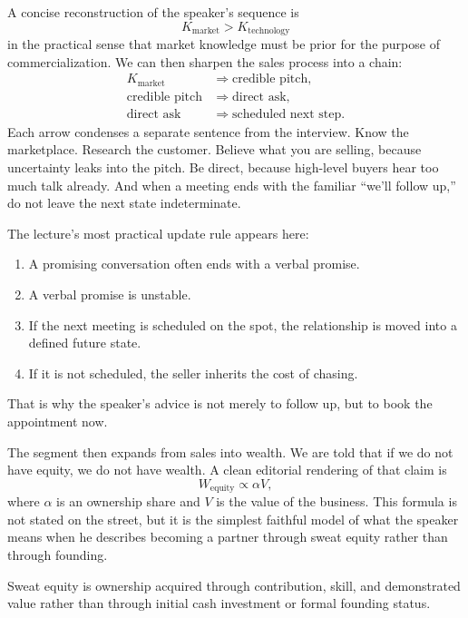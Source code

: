 A concise reconstruction of the speaker's sequence is
\begin{equation}
K_{\text{market}} > K_{\text{technology}}
\end{equation}
in the practical sense that market knowledge must be prior for the purpose of commercialization. We can then sharpen the sales process into a chain:
\begin{align}
K_{\text{market}}
&\Rightarrow
\text{credible pitch}, \\
\text{credible pitch}
&\Rightarrow
\text{direct ask}, \\
\text{direct ask}
&\Rightarrow
\text{scheduled next step}.
\end{align}
Each arrow condenses a separate sentence from the interview. Know the marketplace. Research the customer. Believe what you are selling, because uncertainty leaks into the pitch. Be direct, because high-level buyers hear too much talk already. And when a meeting ends with the familiar ``we'll follow up,'' do not leave the next state indeterminate.

The lecture's most practical update rule appears here:
\begin{enumerate}
\item A promising conversation often ends with a verbal promise.
\item A verbal promise is unstable.
\item If the next meeting is scheduled on the spot, the relationship is moved into a defined future state.
\item If it is not scheduled, the seller inherits the cost of chasing.
\end{enumerate}
That is why the speaker's advice is not merely to follow up, but to book the appointment now.

The segment then expands from sales into wealth. We are told that if we do not have equity, we do not have wealth. A clean editorial rendering of that claim is
\begin{equation}
W_{\text{equity}} \propto \alpha V,
\end{equation}
where \(\alpha\) is an ownership share and \(V\) is the value of the business. This formula is not stated on the street, but it is the simplest faithful model of what the speaker means when he describes becoming a partner through sweat equity rather than through founding.

\begin{definition}
Sweat equity is ownership acquired through contribution, skill, and demonstrated value rather than through initial cash investment or formal founding status.
\end{definition}

